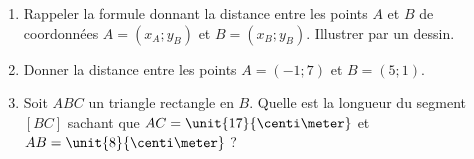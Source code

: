 
\begin{exercice}\label{exosmath-0026}

    \begin{enumerate}
        \item
            Rappeler la formule donnant la distance entre les points \( A\) et \( B\) de coordonnées \( A=(x_A;y_B)\) et \( B=(x_B;y_B)\). Illustrer par un dessin.
        \item
            Donner la distance entre les points \( A=(-1;7)\) et \( B=(5;1)\).
        \item
            Soit \( ABC\) un triangle rectangle en \( B\). Quelle est la longueur du segment \( [BC]\) sachant que \( AC=\unit{17}{\centi\meter}\) et \( AB=\unit{8}{\centi\meter}\) ?
    \end{enumerate}

\end{exercice}
